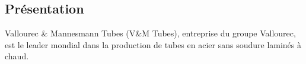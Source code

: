 \documentclass[10pt,fleqn]{article} %
\begin{document}

\vspace{5cm}
\pagestyle{fancy}
\thispagestyle{plain}

\def\columnseprulecolor{\color{ocre}}
\setlength{\columnseprule}{0.4pt} 

\def\pathfig{images}

\begin{multicols}{2}


\subsection*{Présentation}
Vallourec \& Mannesmann Tubes (V\&M Tubes), entreprise du groupe Vallourec, est le leader mondial dans la production de tubes en acier sans soudure laminés à chaud. %


\end{multicols}
\end{document}
